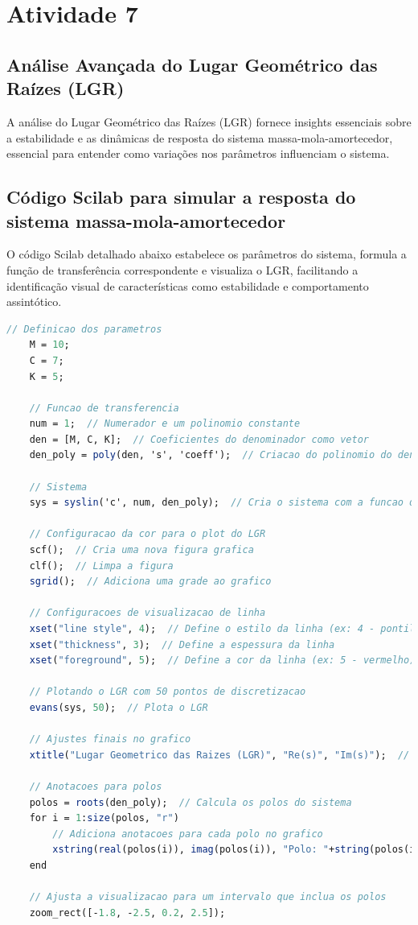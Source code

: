 \section{Atividade 7}

\subsection{Análise Avançada do Lugar Geométrico das Raízes (LGR)}

A análise do Lugar Geométrico das Raízes (LGR) fornece insights essenciais sobre a estabilidade e as dinâmicas de resposta do sistema massa-mola-amortecedor, essencial para entender como variações nos parâmetros influenciam o sistema.

\subsection{Código Scilab para simular a resposta do sistema massa-mola-amortecedor}

O código Scilab detalhado abaixo estabelece os parâmetros do sistema, formula a função de transferência correspondente e visualiza o LGR, facilitando a identificação visual de características como estabilidade e comportamento assintótico.

\begin{lstlisting}[language=Scilab, caption=Código Scilab para simular o Lugar geométrico das raízes]
    // Definicao dos parametros
    M = 10;
    C = 7;
    K = 5;
    
    // Funcao de transferencia
    num = 1;  // Numerador e um polinomio constante
    den = [M, C, K];  // Coeficientes do denominador como vetor
    den_poly = poly(den, 's', 'coeff');  // Criacao do polinomio do denominador com os coeficientes
    
    // Sistema
    sys = syslin('c', num, den_poly);  // Cria o sistema com a funcao de transferencia
    
    // Configuracao da cor para o plot do LGR
    scf();  // Cria uma nova figura grafica
    clf();  // Limpa a figura
    sgrid();  // Adiciona uma grade ao grafico
    
    // Configuracoes de visualizacao de linha
    xset("line style", 4);  // Define o estilo da linha (ex: 4 - pontilhada)
    xset("thickness", 3);  // Define a espessura da linha
    xset("foreground", 5);  // Define a cor da linha (ex: 5 - vermelho)
    
    // Plotando o LGR com 50 pontos de discretizacao
    evans(sys, 50);  // Plota o LGR
    
    // Ajustes finais no grafico
    xtitle("Lugar Geometrico das Raizes (LGR)", "Re(s)", "Im(s)");  // Adiciona titulo e rotulos aos eixos
    
    // Anotacoes para polos
    polos = roots(den_poly);  // Calcula os polos do sistema
    for i = 1:size(polos, "r")
        // Adiciona anotacoes para cada polo no grafico
        xstring(real(polos(i)), imag(polos(i)), "Polo: "+string(polos(i)));
    end
    
    // Ajusta a visualizacao para um intervalo que inclua os polos
    zoom_rect([-1.8, -2.5, 0.2, 2.5]);
\end{lstlisting}

